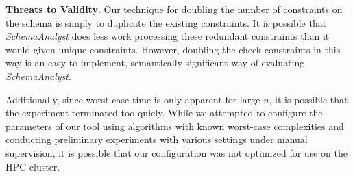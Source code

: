 
\textbf{Threats to Validity}. Our technique for doubling the number of constraints on the schema is simply to
duplicate the existing constraints. It is possible that \textit{SchemaAnalyst} does less work processing these
redundant constraints than it would given unique constraints. However, doubling the check constraints in this
way is an easy to implement, semantically significant way of evaluating \textit{SchemaAnalyst}.

Additionally, since worst-case time is only apparent for large $n$, it
is possible that the experiment terminated too quicly.  While we
attempted to configure the parameters of our tool using algorithms with
known worst-case complexities and conducting preliminary experiments with
various settings under manual supervision, it is possible that our
configuration was not optimized for use on the HPC cluster. 

